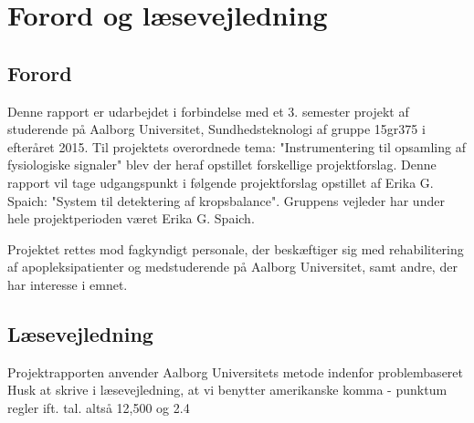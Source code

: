 \chapter*{Forord og læsevejledning}
\section{Forord}
Denne rapport er udarbejdet i forbindelse med et 3. semester projekt af studerende på Aalborg Universitet,  Sundhedsteknologi af gruppe 15gr375 i efteråret 2015. Til projektets overordnede tema: "Instrumentering til opsamling af fysiologiske signaler" blev der heraf opstillet forskellige projektforslag. Denne rapport vil tage udgangspunkt i følgende projektforslag opstillet af Erika G. Spaich: "System til detektering af kropsbalance". Gruppens vejleder har under hele projektperioden været Erika G. Spaich.

Projektet rettes mod fagkyndigt personale, der beskæftiger sig med rehabilitering af apopleksipatienter og medstuderende på Aalborg Universitet, samt andre, der har interesse i emnet. 

\section{Læsevejledning}
Projektrapporten anvender Aalborg Universitets metode indenfor problembaseret 
Husk at skrive i læsevejledning, at vi benytter amerikanske komma - punktum regler ift. tal. altså 12,500 og 2.4